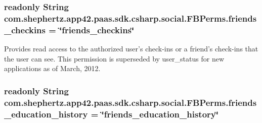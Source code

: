 \hypertarget{classcom_1_1shephertz_1_1app42_1_1paas_1_1sdk_1_1csharp_1_1social_1_1_f_b_perms_aa35b26ec4f03ffe9ebd94305f5db03e8}{
\subsubsection[{friends\+\_\+checkins}]{\setlength{\rightskip}{0pt plus 5cm}readonly String com.\+shephertz.\+app42.\+paas.\+sdk.\+csharp.\+social.\+F\+B\+Perms.\+friends\+\_\+checkins = \char`\"{}friends\+\_\+checkins\char`\"{}\hspace{0.3cm}{\ttfamily [static]}}}\label{classcom_1_1shephertz_1_1app42_1_1paas_1_1sdk_1_1csharp_1_1social_1_1_f_b_perms_aa35b26ec4f03ffe9ebd94305f5db03e8}


Provides read access to the authorized user's check-\/ins or a friend's check-\/ins that the user can see. This permission is superseded by user\+\_\+status for new applications as of March, 2012. 

\hypertarget{classcom_1_1shephertz_1_1app42_1_1paas_1_1sdk_1_1csharp_1_1social_1_1_f_b_perms_a1f7b6fd10abcb6b35c0d3f8a1ca8af48}{
\subsubsection[{friends\+\_\+education\+\_\+history}]{\setlength{\rightskip}{0pt plus 5cm}readonly String com.\+shephertz.\+app42.\+paas.\+sdk.\+csharp.\+social.\+F\+B\+Perms.\+friends\+\_\+education\+\_\+history = \char`\"{}friends\+\_\+education\+\_\+history\char`\"{}\hspace{0.3cm}{\ttfamily [static]}}}\label{classcom_1_1shephertz_1_1app42_1_1paas_1_1sdk_1_1csharp_1_1social_1_1_f_b_perms_a1f7b6fd10abcb6b35c0d3f8a1ca8af48}


